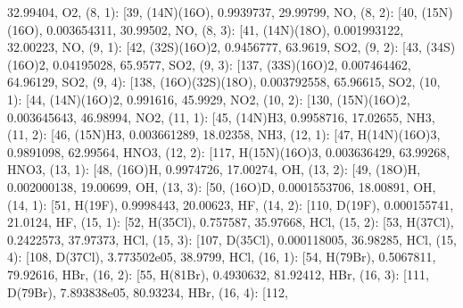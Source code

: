 \documentclass[letterpaper,10pt,english]{sphinxmanual}
\begin{document}
\begin{fulllineitems}
32.99404, \textquotesingle{}O2\textquotesingle{}{]}, (8, 1): {[}39, \textquotesingle{}(14N)(16O)\textquotesingle{}, 0.9939737, 29.99799, \textquotesingle{}NO\textquotesingle{}{]}, (8, 2): {[}40, \textquotesingle{}(15N)(16O)\textquotesingle{}, 0.003654311, 30.99502, \textquotesingle{}NO\textquotesingle{}{]}, (8, 3): {[}41, \textquotesingle{}(14N)(18O)\textquotesingle{}, 0.001993122, 32.00223, \textquotesingle{}NO\textquotesingle{}{]}, (9, 1): {[}42, \textquotesingle{}(32S)(16O)2\textquotesingle{}, 0.9456777, 63.9619, \textquotesingle{}SO2\textquotesingle{}{]}, (9, 2): {[}43, \textquotesingle{}(34S)(16O)2\textquotesingle{}, 0.04195028, 65.9577, \textquotesingle{}SO2\textquotesingle{}{]}, (9, 3): {[}137, \textquotesingle{}(33S)(16O)2\textquotesingle{}, 0.007464462, 64.96129, \textquotesingle{}SO2\textquotesingle{}{]}, (9, 4): {[}138, \textquotesingle{}(16O)(32S)(18O)\textquotesingle{}, 0.003792558, 65.96615, \textquotesingle{}SO2\textquotesingle{}{]}, (10, 1): {[}44, \textquotesingle{}(14N)(16O)2\textquotesingle{}, 0.991616, 45.9929, \textquotesingle{}NO2\textquotesingle{}{]}, (10, 2): {[}130, \textquotesingle{}(15N)(16O)2\textquotesingle{}, 0.003645643, 46.98994, \textquotesingle{}NO2\textquotesingle{}{]}, (11, 1): {[}45, \textquotesingle{}(14N)H3\textquotesingle{}, 0.9958716, 17.02655, \textquotesingle{}NH3\textquotesingle{}{]}, (11, 2): {[}46, \textquotesingle{}(15N)H3\textquotesingle{}, 0.003661289, 18.02358, \textquotesingle{}NH3\textquotesingle{}{]}, (12, 1): {[}47, \textquotesingle{}H(14N)(16O)3\textquotesingle{}, 0.9891098, 62.99564, \textquotesingle{}HNO3\textquotesingle{}{]}, (12, 2): {[}117, \textquotesingle{}H(15N)(16O)3\textquotesingle{}, 0.003636429, 63.99268, \textquotesingle{}HNO3\textquotesingle{}{]}, (13, 1): {[}48, \textquotesingle{}(16O)H\textquotesingle{}, 0.9974726, 17.00274, \textquotesingle{}OH\textquotesingle{}{]}, (13, 2): {[}49, \textquotesingle{}(18O)H\textquotesingle{}, 0.002000138, 19.00699, \textquotesingle{}OH\textquotesingle{}{]}, (13, 3): {[}50, \textquotesingle{}(16O)D\textquotesingle{}, 0.0001553706, 18.00891, \textquotesingle{}OH\textquotesingle{}{]}, (14, 1): {[}51, \textquotesingle{}H(19F)\textquotesingle{}, 0.9998443, 20.00623, \textquotesingle{}HF\textquotesingle{}{]}, (14, 2): {[}110, \textquotesingle{}D(19F)\textquotesingle{}, 0.000155741, 21.0124, \textquotesingle{}HF\textquotesingle{}{]}, (15, 1): {[}52, \textquotesingle{}H(35Cl)\textquotesingle{}, 0.757587, 35.97668, \textquotesingle{}HCl\textquotesingle{}{]}, (15, 2): {[}53, \textquotesingle{}H(37Cl)\textquotesingle{}, 0.2422573, 37.97373, \textquotesingle{}HCl\textquotesingle{}{]}, (15, 3): {[}107, \textquotesingle{}D(35Cl)\textquotesingle{}, 0.000118005, 36.98285, \textquotesingle{}HCl\textquotesingle{}{]}, (15, 4): {[}108, \textquotesingle{}D(37Cl)\textquotesingle{}, 3.773502e\sphinxhyphen{}05, 38.9799, \textquotesingle{}HCl\textquotesingle{}{]}, (16, 1): {[}54, \textquotesingle{}H(79Br)\textquotesingle{}, 0.5067811, 79.92616, \textquotesingle{}HBr\textquotesingle{}{]}, (16, 2): {[}55, \textquotesingle{}H(81Br)\textquotesingle{}, 0.4930632, 81.92412, \textquotesingle{}HBr\textquotesingle{}{]}, (16, 3): {[}111, \textquotesingle{}D(79Br)\textquotesingle{}, 7.893838e\sphinxhyphen{}05, 80.93234, \textquotesingle{}HBr\textquotesingle{}{]}, (16, 4): {[}112, 
\end{fulllineitems}
\end{document}
